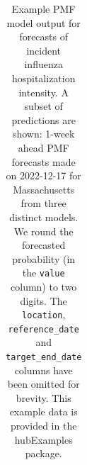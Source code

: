 \documentclass[
  letterpaper,
  DIV=11,
  numbers=noendperiod]{scrartcl}
\begin{document}
\begin{longtable}[]{@{}
  >{\raggedright\arraybackslash}p{}
  >{\raggedright\arraybackslash}p{}
  >{\raggedleft\arraybackslash}p{}
  >{\raggedright\arraybackslash}p{}
  >{\raggedright\arraybackslash}p{}
  >{\raggedleft\arraybackslash}p{}@{}}

\caption{\label{tbl-example-forecasts-pmf}Example PMF model output for
forecasts of incident influenza hospitalization intensity. A subset of
predictions are shown: 1-week ahead PMF forecasts made on 2022-12-17 for
Massachusetts from three distinct models. We round the forecasted
probability (in the \texttt{value} column) to two digits. The
\texttt{location}, \texttt{reference\_date} and
\texttt{target\_end\_date} columns have been omitted for brevity. This
example data is provided in the {hubExamples} package.}

\tabularnewline


\end{longtable}
\end{document}
